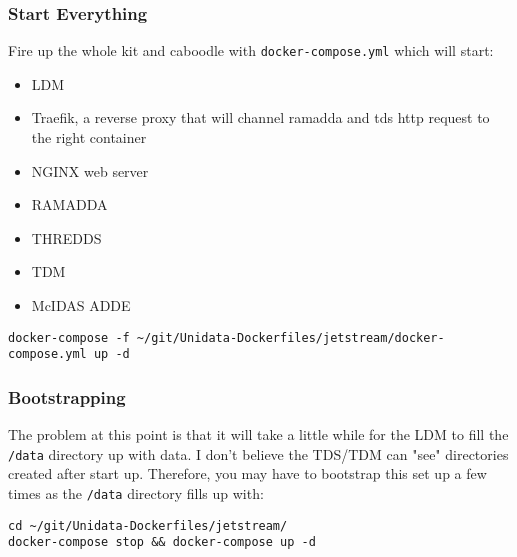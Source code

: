 \documentclass[onecolumn,9pt]{article}
\renewcommand{\href}[2]{#2\footnoteURL{\url{#1}}}
\begin{document}
\subsubsection{Start Everything}
\label{sec:orgheadline30}

Fire up the whole kit and caboodle with \texttt{docker-compose.yml} which will start:

\begin{itemize}
\item LDM
\item \href{https://traefik.io/}{Traefik}, a reverse proxy that will channel ramadda and tds http request to the right container
\item NGINX web server
\item RAMADDA
\item THREDDS
\item TDM
\item McIDAS ADDE
\end{itemize}

\lstset{frame=lines,basicstyle=\footnotesize,numbers=left,numberstyle=\tiny,language=sh,label= ,caption= ,captionpos=b}
\begin{lstlisting}
docker-compose -f ~/git/Unidata-Dockerfiles/jetstream/docker-compose.yml up -d
\end{lstlisting}

\subsubsection{Bootstrapping}
\label{sec:orgheadline31}

The problem at this point is that it will take a little while for the LDM to fill the \texttt{/data} directory up with data. I don't believe the TDS/TDM can "see" directories created after start up. Therefore, you may have to bootstrap this set up a few times as the \texttt{/data} directory fills up with:

\lstset{frame=lines,basicstyle=\footnotesize,numbers=left,numberstyle=\tiny,language=sh,label= ,caption= ,captionpos=b}
\begin{lstlisting}
cd ~/git/Unidata-Dockerfiles/jetstream/
docker-compose stop && docker-compose up -d
\end{lstlisting}
\end{document}
